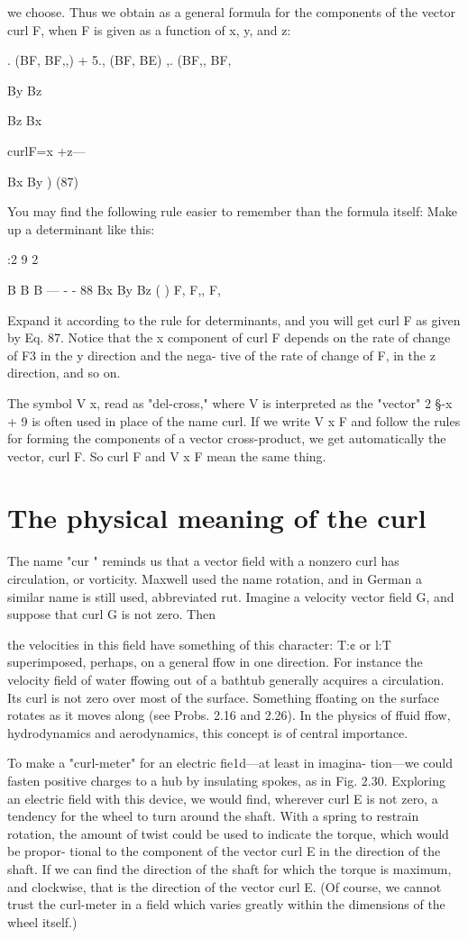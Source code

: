 {%
 

we choose. Thus we obtain as a general formula for the components
of the vector curl F, when F is given as a function of x, y, and z:

. (BF, BF,,) + 5., (BF, BE) ,. (BF,, BF,

By Bz

Bz Bx

curlF=x +z---

Bx By ) (87)

You may find the following rule easier to remember than the formula
itself: Make up a determinant like this:

:2 9 2

B B B
--- - - 88
Bx By Bz ( )
F, F,, F,

Expand it according to the rule for determinants, and you will get
curl F as given by Eq. 87. Notice that the x component of curl F
depends on the rate of change of F3 in the y direction and the nega-
tive of the rate of change of F, in the z direction, and so on.

The symbol V x, read as "del-cross," where V is interpreted as the
"vector"
2 §-x + 9%
is often used in place of the name curl. If we write V x F and follow
the rules for forming the components of a vector cross-product, we
get automatically the vector, curl F. So curl F and V x F mean the
same thing.

\section{The physical meaning of the curl}

The name "cur " reminds us that a vector field with a nonzero curl
has circulation, or vorticity. Maxwell used the name rotation, and
in German a similar name is still used, abbreviated rut. Imagine
a velocity vector field G, and suppose that curl G is not zero. Then

the velocities in this field have something of this character: T:¢ or
l:T superimposed, perhaps, on a general ffow in one direction. For
instance the velocity field of water ffowing out of a bathtub generally
acquires a circulation. Its curl is not zero over most of the surface.
Something ffoating on the surface rotates as it moves along (see
Probs. 2.16 and 2.26). In the physics of ffuid ffow, hydrodynamics
and aerodynamics, this concept is of central importance.

To make a "curl-meter" for an electric fie1d---at least in imagina-
tion---we could fasten positive charges to a hub by insulating spokes,
as in Fig. 2.30. Exploring an electric field with this device, we would
find, wherever curl E is not zero, a tendency for the wheel to turn
around the shaft. With a spring to restrain rotation, the amount of
twist could be used to indicate the torque, which would be propor-
tional to the component of the vector curl E in the direction of the
shaft. If we can find the direction of the shaft for which the torque
is maximum, and clockwise, that is the direction of the vector curl E.
(Of course, we cannot trust the curl-meter in a field which varies
greatly within the dimensions of the wheel itself.)

}
